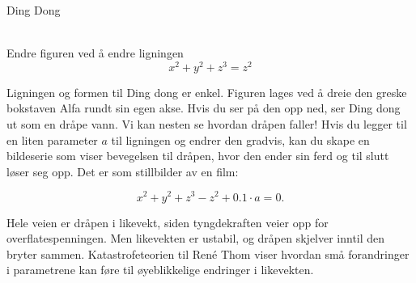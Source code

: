 \documentclass[no]{./../../common/SurferDesc}%
\begin{document}
\footnotesize

\begin{surferPage}
  \begin{surferTitle}Ding Dong\end{surferTitle}  \\
Endre figuren ved å endre ligningen\\

\smallskip
\[x^2	+ y^2	+ z^3	= z^2\]

\singlespacing
Ligningen og formen til Ding dong er enkel. Figuren lages ved å dreie den greske bokstaven Alfa rundt sin egen akse. Hvis du ser på den opp ned, ser Ding dong ut som en dråpe vann. Vi kan nesten se hvordan dråpen faller! 
\newline
Hvis du legger til en liten parameter $a$ til ligningen og endrer den gradvis, kan du skape en bildeserie som viser bevegelsen til dråpen, hvor den ender sin ferd og til slutt løser seg opp. Det er som stillbilder av en film:

\[x^2	+ y^2	+ z^3	-z^2+0.1\cdot a=0.\]

Hele veien er dråpen i likevekt, siden tyngdekraften veier opp for overflatespenningen. Men likevekten er ustabil, og dråpen skjelver inntil den bryter sammen. Katastrofeteorien til René Thom viser hvordan små forandringer i parametrene kan føre til øyeblikkelige endringer i likevekten. 


  \begin{surferText}
     \end{surferText}
\end{surferPage}


\end{document}
